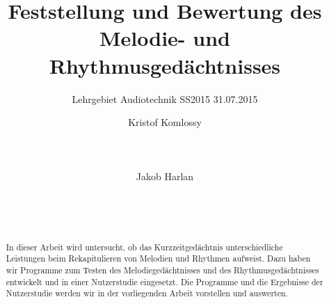 \documentclass{acm_proc_article-sp}
\begin{document}
\title{Feststellung und Bewertung des Melodie- und Rhythmusgedächtnisses}
\subtitle{Lehrgebiet Audiotechnik SS2015 31.07.2015}

\author{
\alignauthor
Kristof Komlossy\\
       \\
       \\
       \\
\alignauthor
Jakob Harlan\\
       \\
       \\
       \\
} %

\maketitle

\begin{abstract}
In dieser Arbeit wird untersucht, ob das Kurzzeitgedächtnis unterschiedliche Leistungen beim Rekapitulieren von Melodien und Rhythmen aufweist. Dazu haben wir Programme zum Testen des Melodiegedächtnisses und des Rhythmusgedächtnisses entwickelt und in einer Nutzerstudie eingesetzt. Die Programme und die Ergebnisse der Nutzerstudie werden wir in der vorliegenden Arbeit vorstellen und auswerten.
\end{abstract}

\end{document}
